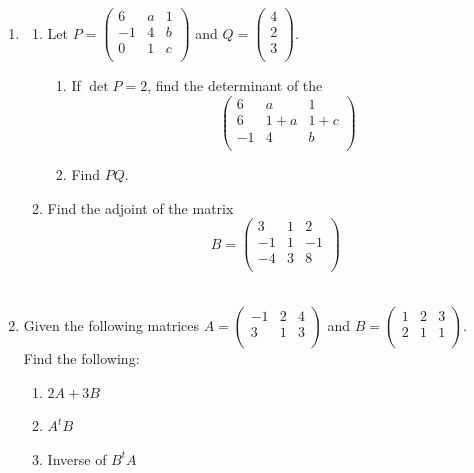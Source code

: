 \documentclass[11pt,a4paper]{article}
\theoremstyle{definition}
\begin{document}
\begin{enumerate}
\item
\begin{enumerate}
\item Let $P=
\begin{pmatrix}
6 & a & 1\\
-1 & 4 & b \\
0 & 1 & c\\
\end{pmatrix}
$ and $
Q=
\begin{pmatrix}
4\\ 2\\3\\
\end{pmatrix}
$.\\


\begin{enumerate}
\item If $\det P =2$, find the determinant of the $$
\begin{pmatrix}
6 & a & 1\\
6 & 1+a & 1+c\\
-1 & 4 & b\\
\end{pmatrix}
$$
\item Find $PQ$.\\
\end{enumerate}


\item Find the adjoint of the matrix $$B=
\begin{pmatrix}
3 & 1 & 2\\
-1 & 1 & -1\\
-4 & 3 & 8\\
\end{pmatrix}
$$\\
\end{enumerate}

\item Given the following matrices $A=
\begin{pmatrix}
-1 & 2 & 4\\
3 & 1 & 3\\
\end{pmatrix}
$ and $B=
\begin{pmatrix}
1 & 2 & 3\\
2 & 1 & 1\\
\end{pmatrix}
$.\\
Find the following:
\begin{enumerate}
\item $2A +3B$
\item $A^tB$
\item Inverse of $B^tA$\\
\end{enumerate}





\end{enumerate}
\end{document}
